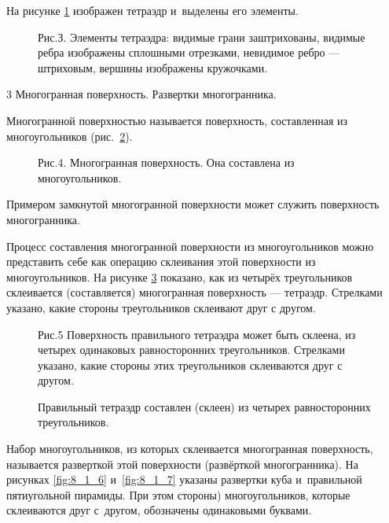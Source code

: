 На рисунке \ref{fig:8_1_3} изображен тетраэдр и~выделены его элементы.

\begin{figure}\label{fig:8_1_3}
\caption{Рис.З. Элементы тетраэдра: видимые грани заштрихованы, видимые ребра
изображены сплошными отрезками, невидимое ребро --- штриховым,
вершины изображены кружочками.}
\end{figure}

\par{3 Многогранная поверхность. Развертки многогранника.}

Многогранной поверхностью называется поверхность, составленная из многоугольников
(рис.\ \ref{fig:8_1_4}).

\begin{figure}\label{fig:8_1_4}
\caption{Рис.4. Многогранная поверхность. Она составлена из многоугольников.}
\end{figure}

Примером замкнутой многогранной поверхности может служить поверхность
многогранника.

Процесс составления многогранной поверхности из многоугольников можно представить
себе как операцию склеивания этой поверхности из многоугольников.
На рисунке \ref{fig:8_1_5} показано, как из четырёх треугольников склеивается
(составляется) многогранная поверхность --- тетраэдр. Стрелками указано,
какие стороны треугольников склеивают друг с другом.

\begin{figure}\label{fig:8_1_5}
\caption{Рис.5 Поверхность правильного тетраэдра может быть
склеена, из четырех одинаковых равносторонних треугольников. Стрелками
указано, какие стороны этих треугольников склеиваются друг с другом.}
\end{figure}


\begin{figure}\label{fig:8_1_x}
\caption{Правильный тетраэдр составлен (склеен) из четырех равносторонних
треугольников.}
\end{figure}

Набор многоугольников, из которых склеивается многогранная поверхность, называется
разверткой этой поверхности (развёрткой многогранника). На рисунках
\ref{fig:8_1_6} и~\ref{fig:8_1_7} указаны развертки куба и~правильной пятиугольной
пирамиды. При этом стороны) многоугольников, которые склеиваются друг с~другом,
обозначены одинаковыми буквами.

